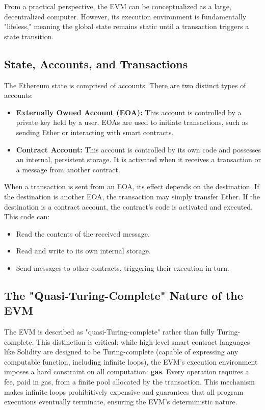 \documentclass{scrbook}
\begin{document}
From a practical perspective, the EVM can be conceptualized as a large, decentralized computer. However, its execution environment is fundamentally "lifeless," meaning the global state remains static until a transaction triggers a state transition.

\subsection{State, Accounts, and Transactions}

The Ethereum state is comprised of accounts. There are two distinct types of accounts:

\begin{itemize}
    \item \textbf{Externally Owned Account (EOA):} This account is controlled by a private key held by a user. EOAs are used to initiate transactions, such as sending Ether or interacting with smart contracts.
    
    \item \textbf{Contract Account:} This account is controlled by its own code and possesses an internal, persistent storage. It is activated when it receives a transaction or a message from another contract.
\end{itemize}

When a transaction is sent from an EOA, its effect depends on the destination. If the destination is another EOA, the transaction may simply transfer Ether. If the destination is a contract account, the contract's code is activated and executed. This code can:

\begin{itemize}
    \item Read the contents of the received message.
    \item Read and write to its own internal storage.
    \item Send messages to other contracts, triggering their execution in turn.
\end{itemize}

\subsection{The "Quasi-Turing-Complete" Nature of the EVM}

The EVM is described as "quasi-Turing-complete" rather than fully Turing-complete. This distinction is critical: while high-level smart contract languages like Solidity are designed to be Turing-complete (capable of expressing any computable function, including infinite loops), the EVM's execution environment imposes a hard constraint on all computation: \textbf{gas}. Every operation requires a fee, paid in gas, from a finite pool allocated by the transaction. This mechanism makes infinite loops prohibitively expensive and guarantees that all program executions eventually terminate, ensuring the EVM's deterministic nature.
\end{document}

